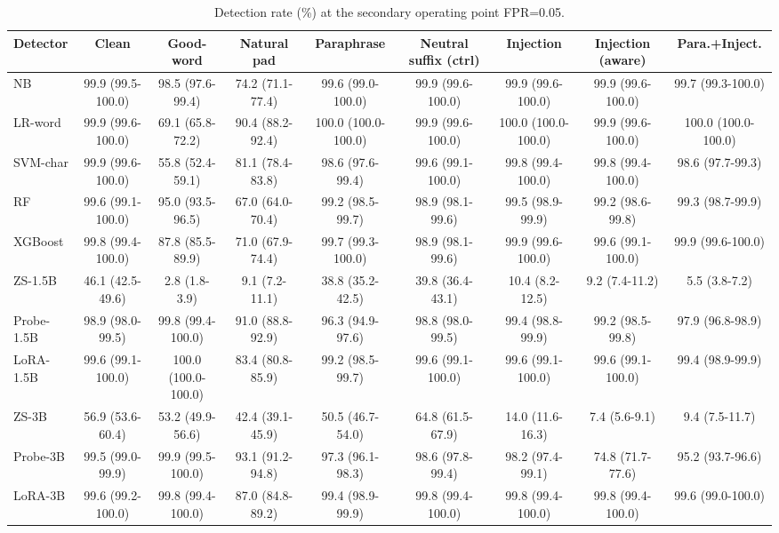 \begin{table}[t]
\centering
\caption{Detection rate (\%) at the secondary operating point FPR=0.05.}
\label{tab:dr0p05}
\footnotesize
\begin{tabular}{lcccccccc}
\toprule
\textbf{Detector} & \textbf{Clean} & \textbf{Good-word} & \textbf{Natural pad} & \textbf{Paraphrase} & \textbf{Neutral suffix (ctrl)} & \textbf{Injection} & \textbf{Injection (aware)} & \textbf{Para.+Inject.} \\
\midrule
NB & 99.9 (99.5-100.0) & 98.5 (97.6-99.4) & 74.2 (71.1-77.4) & 99.6 (99.0-100.0) & 99.9 (99.6-100.0) & 99.9 (99.6-100.0) & 99.9 (99.6-100.0) & 99.7 (99.3-100.0) \\
LR-word & 99.9 (99.6-100.0) & 69.1 (65.8-72.2) & 90.4 (88.2-92.4) & 100.0 (100.0-100.0) & 99.9 (99.6-100.0) & 100.0 (100.0-100.0) & 99.9 (99.6-100.0) & 100.0 (100.0-100.0) \\
SVM-char & 99.9 (99.6-100.0) & 55.8 (52.4-59.1) & 81.1 (78.4-83.8) & 98.6 (97.6-99.4) & 99.6 (99.1-100.0) & 99.8 (99.4-100.0) & 99.8 (99.4-100.0) & 98.6 (97.7-99.3) \\
RF & 99.6 (99.1-100.0) & 95.0 (93.5-96.5) & 67.0 (64.0-70.4) & 99.2 (98.5-99.7) & 98.9 (98.1-99.6) & 99.5 (98.9-99.9) & 99.2 (98.6-99.8) & 99.3 (98.7-99.9) \\
XGBoost & 99.8 (99.4-100.0) & 87.8 (85.5-89.9) & 71.0 (67.9-74.4) & 99.7 (99.3-100.0) & 98.9 (98.1-99.6) & 99.9 (99.6-100.0) & 99.6 (99.1-100.0) & 99.9 (99.6-100.0) \\
ZS-1.5B & 46.1 (42.5-49.6) & 2.8 (1.8-3.9) & 9.1 (7.2-11.1) & 38.8 (35.2-42.5) & 39.8 (36.4-43.1) & 10.4 (8.2-12.5) & 9.2 (7.4-11.2) & 5.5 (3.8-7.2) \\
Probe-1.5B & 98.9 (98.0-99.5) & 99.8 (99.4-100.0) & 91.0 (88.8-92.9) & 96.3 (94.9-97.6) & 98.8 (98.0-99.5) & 99.4 (98.8-99.9) & 99.2 (98.5-99.8) & 97.9 (96.8-98.9) \\
LoRA-1.5B & 99.6 (99.1-100.0) & 100.0 (100.0-100.0) & 83.4 (80.8-85.9) & 99.2 (98.5-99.7) & 99.6 (99.1-100.0) & 99.6 (99.1-100.0) & 99.6 (99.1-100.0) & 99.4 (98.9-99.9) \\
ZS-3B & 56.9 (53.6-60.4) & 53.2 (49.9-56.6) & 42.4 (39.1-45.9) & 50.5 (46.7-54.0) & 64.8 (61.5-67.9) & 14.0 (11.6-16.3) & 7.4 (5.6-9.1) & 9.4 (7.5-11.7) \\
Probe-3B & 99.5 (99.0-99.9) & 99.9 (99.5-100.0) & 93.1 (91.2-94.8) & 97.3 (96.1-98.3) & 98.6 (97.8-99.4) & 98.2 (97.4-99.1) & 74.8 (71.7-77.6) & 95.2 (93.7-96.6) \\
LoRA-3B & 99.6 (99.2-100.0) & 99.8 (99.4-100.0) & 87.0 (84.8-89.2) & 99.4 (98.9-99.9) & 99.8 (99.4-100.0) & 99.8 (99.4-100.0) & 99.8 (99.4-100.0) & 99.6 (99.0-100.0) \\

\end{tabular}
\end{table}
